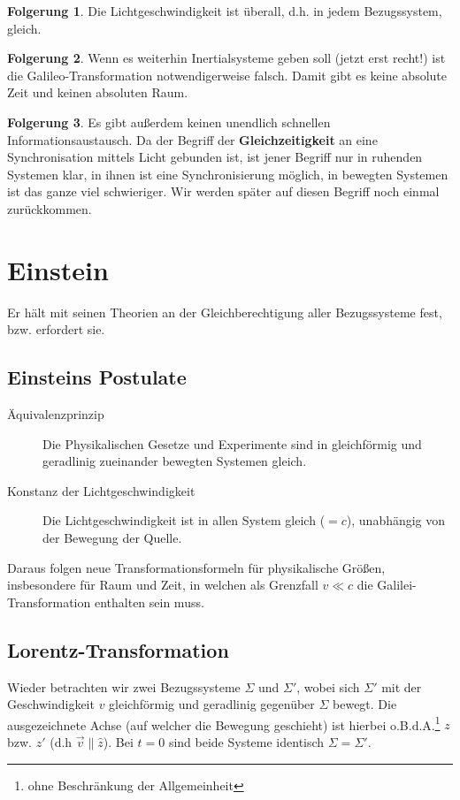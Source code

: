 \documentclass[oneside]{book}
\theoremstyle{definition}
\newtheorem*{folgerung*}{Folgerung}
\begin{document}
\begin{folgerung*}
	Die Lichtgeschwindigkeit ist überall, d.h. in jedem Bezugssystem, gleich.
\end{folgerung*}
\begin{folgerung*}
	Wenn es weiterhin Inertialsysteme geben soll (jetzt erst recht!) ist die Galileo-Transformation notwendigerweise falsch. Damit gibt es keine absolute Zeit und keinen absoluten Raum.
\end{folgerung*}
\begin{folgerung*}
	Es gibt außerdem keinen unendlich schnellen Informationsaustausch. Da der Begriff der \textbf{Gleichzeitigkeit} an eine Synchronisation mittels Licht gebunden ist, ist jener Begriff nur in ruhenden Systemen klar, in ihnen ist eine Synchronisierung möglich, in bewegten Systemen ist das ganze viel schwieriger. Wir werden später auf diesen Begriff noch einmal zurückkommen.
\end{folgerung*}

\section{Einstein}
Er hält mit seinen Theorien an der Gleichberechtigung aller Bezugssysteme fest, bzw. erfordert sie.

\subsection{Einsteins Postulate}
\begin{description}
	\item[Äquivalenzprinzip] Die Physikalischen Gesetze und Experimente sind in gleichförmig und geradlinig zueinander bewegten Systemen gleich.
	\item[Konstanz der Lichtgeschwindigkeit] Die Lichtgeschwindigkeit ist in allen System gleich ($=c$), unabhängig von der Bewegung der Quelle. 
\end{description}
Daraus folgen neue Transformationsformeln für physikalische Größen, insbesondere für Raum und Zeit, in welchen als Grenzfall $v \ll c$ die Galilei-Transformation enthalten sein muss.

\subsection{Lorentz-Transformation}
Wieder betrachten wir zwei Bezugssysteme $\Sigma$ und $\Sigma'$, wobei sich $\Sigma'$ mit der Geschwindigkeit $v$ gleichförmig und geradlinig gegenüber $\Sigma$ bewegt. Die ausgezeichnete Achse (auf welcher die Bewegung geschieht) ist hierbei o.B.d.A.\footnote{ohne Beschränkung der Allgemeinheit} $z$ bzw. $z'$ (d.h $\vec{v} \parallel \hat{z}$). Bei $t = 0$ sind beide Systeme identisch $\Sigma = \Sigma'$.
\end{document}
